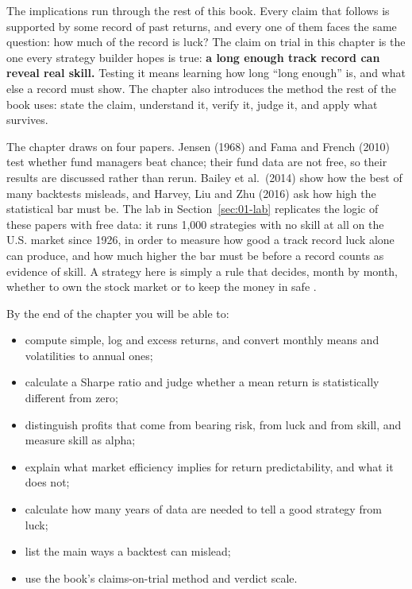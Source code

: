 The implications run through the rest of this book. Every claim that follows is supported by some record of past returns, and every one of them faces the same question: how much of the record is luck? The claim on trial in this chapter is the one every strategy builder hopes is true: \textbf{a long enough track record can reveal real skill.} Testing it means learning how long ``long enough'' is, and what else a record must show. The chapter also introduces the method the rest of the book uses: state the claim, understand it, verify it, judge it, and apply what survives.

The chapter draws on four papers. Jensen (1968) and Fama and French (2010) test whether fund managers beat chance; their fund data are not free, so their results are discussed rather than rerun. Bailey et al.\ (2014) show how the best of many backtests misleads, and Harvey, Liu and Zhu (2016) ask how high the statistical bar must be. The lab in Section~\ref{sec:01-lab} replicates the logic of these papers with free data: it runs 1,000 strategies with no skill at all on the U.S. market since 1926, in order to measure how good a track record luck alone can produce, and how much higher the bar must be before a record counts as evidence of skill. A strategy here is simply a rule that decides, month by month, whether to own the stock market or to keep the money in safe .

By the end of the chapter you will be able to:

\begin{itemize}
  \item compute simple, log and excess returns, and convert monthly means and volatilities to annual ones;
  \item calculate a Sharpe ratio and judge whether a mean return is statistically different from zero;
  \item distinguish profits that come from bearing risk, from luck and from skill, and measure skill as alpha;
  \item explain what market efficiency implies for return predictability, and what it does not;
  \item calculate how many years of data are needed to tell a good strategy from luck;
  \item list the main ways a backtest can mislead;
  \item use the book's claims-on-trial method and verdict scale.
\end{itemize}

